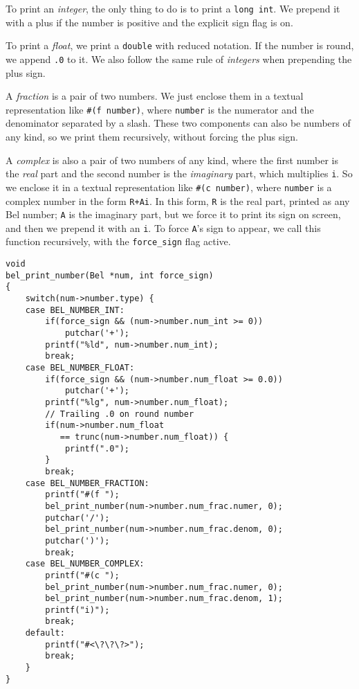 \documentclass[openright,a4paper,twoside,12pt]{memoir}
\begin{document}
To print an \emph{integer}, the only thing to do is to print a \texttt{long int}. We
prepend it with a plus if the number is positive and the explicit sign
flag is on.

To print a \emph{float}, we print a \texttt{double} with reduced notation. If the
number is round, we append \texttt{.0} to it. We also follow the same rule of
\emph{integers} when prepending the plus sign.

A \emph{fraction} is a pair of two numbers. We just enclose them in a textual
representation like \texttt{\#(f number)}, where \texttt{number} is the numerator and
the denominator separated by a slash. These two components can also be
numbers of any kind, so we print them recursively, without forcing the
plus sign.

A \emph{complex} is also a pair of two numbers of any kind, where the first
number is the \emph{real} part and the second number is the \emph{imaginary} part,
which multiplies \texttt{i}. So we enclose it in a textual representation like
\texttt{\#(c number)}, where \texttt{number} is a complex number in the form \texttt{R+Ai}. In
this form, \texttt{R} is the real part, printed as any Bel number; \texttt{A} is the
imaginary part, but we force it to print its sign on screen, and then
we prepend it with an \texttt{i}. To force \texttt{A}'s sign to appear, we call this
function recursively, with the \texttt{force\_sign} flag active.

\begin{verbatim}
void
bel_print_number(Bel *num, int force_sign)
{
    switch(num->number.type) {
    case BEL_NUMBER_INT:
        if(force_sign && (num->number.num_int >= 0))
            putchar('+');
        printf("%ld", num->number.num_int);
        break;
    case BEL_NUMBER_FLOAT:
        if(force_sign && (num->number.num_float >= 0.0))
            putchar('+');
        printf("%lg", num->number.num_float);
        // Trailing .0 on round number
        if(num->number.num_float
           == trunc(num->number.num_float)) {
            printf(".0");
        }
        break;
    case BEL_NUMBER_FRACTION:
        printf("#(f ");
        bel_print_number(num->number.num_frac.numer, 0);
        putchar('/');
        bel_print_number(num->number.num_frac.denom, 0);
        putchar(')');
        break;
    case BEL_NUMBER_COMPLEX:
        printf("#(c ");
        bel_print_number(num->number.num_frac.numer, 0);
        bel_print_number(num->number.num_frac.denom, 1);
        printf("i)");
        break;
    default:
        printf("#<\?\?\?>");
        break;
    }
}
\end{verbatim}
\end{document}

